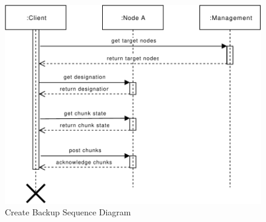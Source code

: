 \begin{figure}[h]
    \centering
    \includegraphics[width=\linewidth]{resources/create_backup}
    \caption{Create Backup Sequence Diagram}
    \label{fig:create-backup}
\end{figure}

